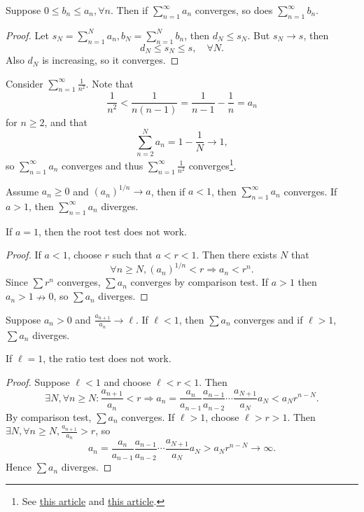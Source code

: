 \begin{theorem}\label{thm:Comparison test}
    Suppose $ 0\le b_n\le a_n, \forall n $. Then if $ \sum_{n=1}^{\infty} a_n $ converges, so does $\sum_{n=1}^{\infty} b_n$.
\end{theorem}
\begin{proof}
    Let $ s_N=\sum_{n=1}^{N}a_n, b_N=\sum_{n=1}^{N}b_n $, then $ d_N\le s_N $. But $s_N\to s$, then 
    \[
        d_N\le s_N\le s, \quad\forall N.
    \]
    Also $ d_N $ is increasing, so it converges.
\end{proof}

\begin{example}
    Consider $ \sum_{n=1}^{\infty}\frac{1}{n^2} $. Note that 
    \[
        \frac{1}{n^2}<\frac{1}{n(n-1)} = \frac{1}{n-1}-\frac{1}{n} = a_n
    \]
    for $n\ge 2$, and that
    \[
        \sum_{n=2}^{N} a_n = 1-\frac{1}{N}\to 1,
    \]
    so $ \sum_{n=1}^{\infty}a_n $ converges and thus $ \sum_{n=1}^{\infty}\frac{1}{n^2} $ converges\footnote{See \href{https://www.cnblogs.com/misaka01034/p/BaselProof.html}{this article} and \href{https://www.math.cmu.edu/~bwsulliv/basel-problem.pdf}{this article}.}.
\end{example}

\begin{theorem}\label{thm:Root test}
    Assume $a_n\ge 0$ and $ (a_n)^{1/n}\to a $, then if $a<1$, then $ \sum_{n=1}^{\infty}a_n$ converges. If $ a>1 $, then $\sum_{n=1}^{\infty}a_n$ diverges.
\end{theorem}
\begin{remark}
    If $a=1$, then the root test does not work.
\end{remark}
\begin{proof}
    If $ a<1 $, choose $r$ such that $a<r<1$. Then there exists $N$ that 
    \[
        \forall n\ge N, (a_n)^{1/n}<r \Longrightarrow a_n<r^n.
    \]
    Since $ \sum r^n $ converges, $\sum a_n$ converges by comparison test. If $a>1$ then $a_n>1\nrightarrow 0$, so $\sum a_n$ diverges.
\end{proof}

\begin{theorem}\label{thm:Ratio test}
    Suppose $a_n>0$ and $ \frac{a_{n+1}}{a_n}\to \ell $. If $ \ell <1 $, then $ \sum a_n $ converges and if $ \ell >1 $, $ \sum a_n $ diverges.
\end{theorem}
\begin{note}
    If $\ell=1$, the ratio test does not work.
\end{note}
\begin{proof}
    Suppose $\ell<1$ and choose $\ell<r<1$. Then
    \[
        \exists N, \forall n\ge N: \frac{a_{n+1}}{a_n}<r \Longrightarrow a_n = \frac{a_n}{a_{n-1}}\frac{a_{n-1}}{a_{n-2}}\cdots \frac{a_{N+1}}{a_{N}}a_N<a_N r^{n-N} .
    \]
    By comparison test, $ \sum a_n $ converges. If $ \ell >1 $, choose $\ell>r>1$. Then $ \exists N, \forall n\ge N, \frac{a_{n+1}}{a_n}>r $, so 
    \[
        a_n = \frac{a_n}{a_{n-1}}\frac{a_{n-1}}{a_{n-2}}\cdots \frac{a_{N+1}}{a_{N}}a_N>a_N r^{n-N}\to \infty.
    \]
    Hence $ \sum a_n $ diverges.
\end{proof}
